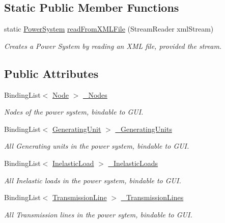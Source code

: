 \subsection*{Static Public Member Functions}
\begin{DoxyCompactItemize}
\item 
static \hyperlink{class_power_system_planning_1_1_power_system}{Power\+System} \hyperlink{class_power_system_planning_1_1_power_system_ad61746fe7b02b94761abec0f022d106a}{read\+From\+X\+M\+L\+File} (Stream\+Reader xml\+Stream)
\begin{DoxyCompactList}\small\item\em Creates a Power System by reading an X\+ML file, provided the stream. \end{DoxyCompactList}\end{DoxyCompactItemize}
\subsection*{Public Attributes}
\begin{DoxyCompactItemize}
\item 
Binding\+List$<$ \hyperlink{class_power_system_planning_1_1_node}{Node} $>$ \hyperlink{class_power_system_planning_1_1_power_system_afe8041cf92b81053ffc54c1ab2cd76cc}{\+\_\+\+Nodes}
\begin{DoxyCompactList}\small\item\em Nodes of the power system, bindable to G\+UI. \end{DoxyCompactList}\item 
Binding\+List$<$ \hyperlink{class_power_system_planning_1_1_generating_unit}{Generating\+Unit} $>$ \hyperlink{class_power_system_planning_1_1_power_system_af58aafa6a09ec68a492ea650e587ee36}{\+\_\+\+Generating\+Units}
\begin{DoxyCompactList}\small\item\em All Generating units in the power system, bindable to G\+UI. \end{DoxyCompactList}\item 
Binding\+List$<$ \hyperlink{class_power_system_planning_1_1_inelastic_load}{Inelastic\+Load} $>$ \hyperlink{class_power_system_planning_1_1_power_system_a00de0d9b9439f8b3ec25b1ac020a503d}{\+\_\+\+Inelastic\+Loads}
\begin{DoxyCompactList}\small\item\em All Inelastic loads in the power system, bindable to G\+UI. \end{DoxyCompactList}\item 
Binding\+List$<$ \hyperlink{class_power_system_planning_1_1_transmission_line}{Transmission\+Line} $>$ \hyperlink{class_power_system_planning_1_1_power_system_a88e97e6852c0105b86408ff9753163ba}{\+\_\+\+Transmission\+Lines}
\begin{DoxyCompactList}\small\item\em All Transmission lines in the power sytem, bindable to G\+UI. \end{DoxyCompactList}\end{DoxyCompactItemize}
